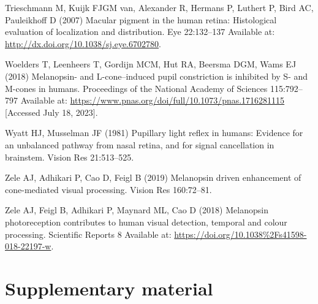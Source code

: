 \documentclass[
]{article}
\begin{document}
\leavevmode\hypertarget{ref-Trieschmann2007}{}%
Trieschmann M, Kuijk FJGM van, Alexander R, Hermans P, Luthert P, Bird AC, Pauleikhoff D (2007) Macular pigment in the human retina: Histological evaluation of localization and distribution. Eye 22:132--137 Available at: \url{http://dx.doi.org/10.1038/sj.eye.6702780}.

\leavevmode\hypertarget{ref-Woelders2018}{}%
Woelders T, Leenheers T, Gordijn MCM, Hut RA, Beersma DGM, Wams EJ (2018) Melanopsin- and L-cone--induced pupil constriction is inhibited by S- and M-cones in humans. Proceedings of the National Academy of Sciences 115:792--797 Available at: \url{https://www.pnas.org/doi/full/10.1073/pnas.1716281115} {[}Accessed July 18, 2023{]}.

\leavevmode\hypertarget{ref-Wyatt1981}{}%
Wyatt HJ, Musselman JF (1981) Pupillary light reflex in humans: Evidence for an unbalanced pathway from nasal retina, and for signal cancellation in brainstem. Vision Res 21:513--525.

\leavevmode\hypertarget{ref-Zele2019}{}%
Zele AJ, Adhikari P, Cao D, Feigl B (2019) Melanopsin driven enhancement of cone-mediated visual processing. Vision Res 160:72--81.

\leavevmode\hypertarget{ref-Zele2018}{}%
Zele AJ, Feigl B, Adhikari P, Maynard ML, Cao D (2018) Melanopsin photoreception contributes to human visual detection, temporal and colour processing. Scientific Reports 8 Available at: \url{https://doi.org/10.1038\%2Fs41598-018-22197-w}.

\pagebreak

\hypertarget{supplementary-material}{%
\section{Supplementary material}\label{supplementary-material}}

\setcounter{table}{0} \renewcommand{\thetable}{S\arabic{table}} \setcounter{figure}{0} \renewcommand{\thefigure}{S\arabic{figure}}
\end{document}
